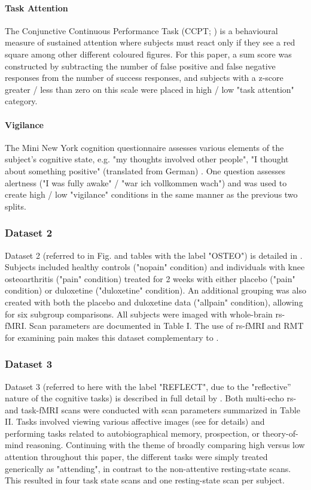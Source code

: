 \paragraph{Task Attention}
The Conjunctive Continuous Performance Task (CCPT;
\cite{shalevConjunctiveContinuousPerformance2011}) is a behavioural measure of sustained attention
where subjects must react only if they see a red square among other different coloured figures. For
this paper, a sum score was constructed by subtracting the number of false positive and false
negative responses from the number of success responses, and subjects with a z-score greater / less
than zero on this scale were placed in high / low "task attention" category.

\paragraph{Vigilance}
The Mini New York cognition questionnaire assesses various elements of the subject's cognitive
state, e.g. "my thoughts involved other people", "I thought about something positive" (translated
from German) \cite{gorgolewskiCorrespondenceIndividualDifferences2014}. One question assesses
alertness ("I was fully awake" / "war ich vollkommen wach") and was used to create high / low
"vigilance" conditions in the same manner as the previous two splits.

\subsubsection{Dataset 2}
Dataset 2 (referred to in Fig. and tables with the label "OSTEO") is detailed in
\cite{tetreaultBrainConnectivityPredicts2016}. Subjects included healthy controls ("nopain"
condition) and individuals with knee osteoarthritis ("pain" condition) treated for 2 weeks with
either placebo ("pain" condition) or duloxetine ("duloxetine" condition). An additional grouping was
also created with both the placebo and duloxetine data ("allpain" condition), allowing for six
subgroup comparisons. All subjects were imaged with whole-brain rs-fMRI. Scan parameters are
documented in Table I. The use of rs-fMRI and RMT for examining pain makes this dataset
complementary to \cite{matharooSpontaneousBackpainAlters2020}.

\subsubsection{Dataset 3}
Dataset 3  (referred to here with the label "REFLECT", due to the "reflective” nature of the
cognitive tasks) is described in full detail by \cite{dupreMultiechoFMRIReplication2016}. Both
multi-echo rs- and task-fMRI scans were conducted with scan parameters summarized in Table II. Tasks
involved viewing various affective images (see \cite{sprengPatternsBrainActivity2010} for details)
and performing tasks related to autobiographical memory, prospection, or theory-of-mind reasoning.
Continuing with the theme of broadly comparing high versus low attention throughout this paper, the
different tasks were simply treated generically as "attending", in contrast to the non-attentive
resting-state scans. This resulted in four task state scans and one resting-state scan per subject.

